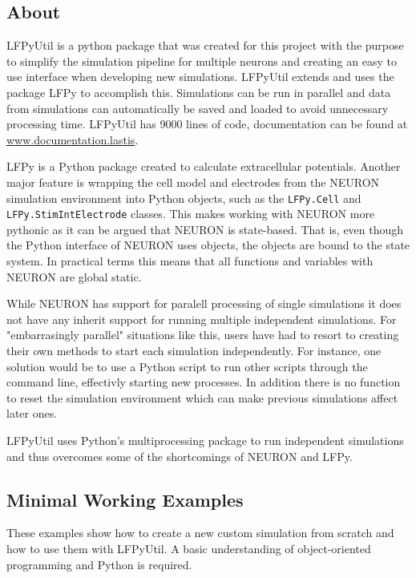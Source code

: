\documentclass[altfont, fleqn]{uiophd}
\begin{document}
\subsection{About}
LFPyUtil is a python package that was created for this project with the purpose
to simplify the simulation pipeline for multiple neurons and creating
an easy to use interface when developing new simulations. 
LFPyUtil extends and uses the package LFPy to accomplish this. 
Simulations can be run in parallel and data from simulations can
automatically be saved and loaded to avoid unnecessary processing time.
LFPyUtil has 9000 lines of code, documentation can be found at
\url{www.documentation.lastis}. 

LFPy is a Python package created to calculate extracellular potentials.
Another major feature is wrapping the cell model and electrodes
from the NEURON simulation environment into Python objects, such as the 
\verb+LFPy.Cell+ and 
\verb+LFPy.StimIntElectrode+ classes.
This makes working with NEURON more pythonic as 
it can be argued that NEURON is
state-based.
That is, even though the Python interface of NEURON uses objects,
the objects are bound to the state system. 
In practical terms this means that all functions and variables
with NEURON are global static. 

While NEURON has support for paralell processing of single simulations
it does not have 
any inherit support for running multiple independent simulations.
For "embarrasingly parallel" situations like this,
users have had to resort to creating their own methods
to start each simulation independently.
For instance, one solution would be to use a Python script to run other scripts
through the command line, effectivly starting new processes.
In addition there is no function to reset the simulation environment
which can make previous simulations affect later ones.

LFPyUtil uses Python's multiprocessing package to run independent simulations
and thus overcomes some of the shortcomings of NEURON and LFPy.
\subsection{Minimal Working Examples}
These examples show how to create a new custom simulation from
scratch and how to use them with LFPyUtil. 
A basic understanding of object-oriented programming 
and Python is required. 
\end{document}
